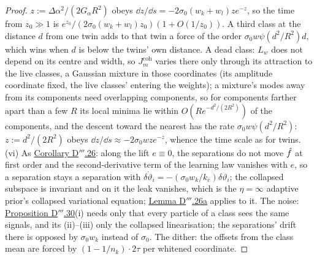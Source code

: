 \begin{proof}
$z := \Delta\alpha^2/(2G_\alpha R^2)$ obeys $\dd z/\dd s = -2\sigma_0(w_k + w_l)ze^{-z}$, so the time from
$z_0\gg1$ is $e^{z_0}/(2\sigma_0(w_k + w_l)z_0)(1 + O(1/z_0))$. A third class at the distance $d$ from one twin adds
to that twin a force of the order $\sigma_0w\psi(d^2/R^2)d$, which wins when $d$ is below the twins' own distance. A
dead class: $L_w$ does not depend on its centre and width, so $J^{\mathrm{coh}}_m$ varies there only through its
attraction to the live classes, a Gaussian mixture in those coordinates (its amplitude coordinate fixed, the live
classes' entering the weights); a mixture's modes away from its components need overlapping components, so for
components farther apart than a few $R$ its local minima lie within $O(Re^{-d^2/(2R^2)})$ of the components, and
the descent toward the nearest has the rate $\sigma_0w\psi(d^2/R^2)$: $z := d^2/(2R^2)$ obeys
$\dd z/\dd s\approx-2\sigma_0wze^{-z}$, whence the time scale as for twins. (vi) As
\hyperref[res:thmDppp:26]{Corollary D$'''$.26}: along the lift $e\equiv0$, the separations do not move $\hat f$ at
first order and the second-derivative term of the learning law vanishes with $e$, so a separation stays a separation
with $\delta\dot\vartheta_i = -(\sigma_0w_k/k_e)\delta\vartheta_i$; the collapsed subspace is invariant and on it the
leak vanishes, which is the $\eta = \infty$ adaptive prior's collapsed variational equation;
\hyperref[res:thmDppp:26a]{Lemma D$'''$.26a} applies to it. The noise:
\hyperref[res:thmDppp:30]{Proposition D$'''$.30}(i) needs only that every particle of a class sees the same signals,
and its (ii)--(iii) only the collapsed linearisation; the separations' drift there is opposed by $\sigma_0w_k$
instead of $\sigma_0$. The dither: the offsets from the class mean are forced by $(1 - 1/n_k)\cdot2\tau$ per whitened
coordinate.
\end{proof}
